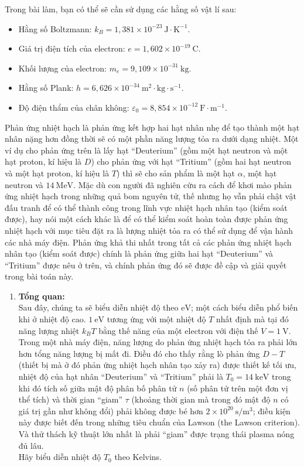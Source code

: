 \begin{vd}
Trong bài làm, bạn có thể sẽ cần sử dụng các hằng số vật lí sau:
\begin{itemize}
    \item Hằng số Boltzmann: $k_{B}=1,381\times 10^{-23}~ \mathrm{J\cdot K^{-1}}$.
    \item Giá trị điện tích của electron: $e=1,602\times 10^{-19} ~\mathrm{C}$.
    \item Khối lượng của electron: $m_{e}=9,109\times 10^{-31}~\mathrm{kg}$.
    \item Hằng số Plank: $h=6,626\times 10^{-34} ~\mathrm{m^2\cdot kg \cdot s^{-1}}$.
    \item Độ điện thẩm của chân không: $\varepsilon_0=8,854\times 10^{-12}  ~\mathrm{F\cdot m^{-1}}$.
\end{itemize}
Phản ứng nhiệt hạch là phản ứng kết hợp hai hạt nhân nhẹ để tạo thành một hạt nhân nặng hơn đồng thời sẽ có một phần năng lượng tỏa ra dưới dạng nhiệt. Một ví dụ cho phản ứng trên là lấy hạt ``Deuterium'' (gồm một hạt neutron và một hạt proton, kí hiệu là $D$) cho phản ứng với hạt ``Tritium'' (gồm hai hạt neutron và một hạt proton, kí hiệu là $T$) thì sẽ cho sản phẩm là một hạt $\alpha$, một hạt neutron và $14~\mathrm{MeV}$. Mặc dù con người đã nghiên cứu ra cách để khơi mào phản ứng nhiệt hạch trong những quả bom nguyên tử, thế nhưng họ vẫn phải chật vật đấu tranh để có thể thành công trong lĩnh vực nhiệt hạch nhân tạo (kiểm soát được), hay nói một cách khác là để có thể kiểm soát hoàn toàn được phản ứng nhiệt hạch với mục tiêu đặt ra là lượng nhiệt tỏa ra có thể sử dụng để vận hành các nhà máy điện. Phản ứng khả thi nhất trong tất cả các phản ứng nhiệt hạch nhân tạo (kiểm soát được) chính là phản ứng giữa hai hạt ``Deuterium'' và ``Tritium'' được nêu ở trên, và chính phản ứng đó sẽ được đề cập và giải quyết trong bài toán này.
\begin{enumerate}[{Phần }A.]
    \item \textbf{Tổng quan:}\\
Sau đây, chúng ta sẽ biểu diễn nhiệt độ theo $\mathrm{eV}$; một cách biểu diễn phổ biến khi ở nhiệt độ cao. $1~\mathrm{eV}$ tương ứng với một nhiệt độ $T$ nhất định mà tại đó năng lượng nhiệt $k_{B}T$ bằng thế năng của một electron với điện thế $V=1~\mathrm{V}$.\\
Trong một nhà máy điện, năng lượng do phản ứng nhiệt hạch tỏa ra phải lớn hơn tổng năng lượng bị mất đi. Điều đó cho thấy rằng lò phản ứng $D-T$ (thiết bị mà ở đó phản ứng nhiệt hạch nhân tạo xảy ra) được thiết kế tối ưu, nhiệt độ của hạt nhân ``Deuterium'' và ``Tritium'' phải là $T_0=14~\mathrm{keV}$ trong khi đó tích số giữa mật độ phân bố phân tử $n$ (số phân tử trên một đơn vị thể tích) và thời gian ``giam'' $\tau$ (khoảng thời gian mà trong đó mật độ $n$ có giá trị gần như không đổi) phải không được bé hơn $2\times 10^{20} ~\mathrm{s/m^3}$; điều kiện này được biết đến trong những tiêu chuẩn của Lawson (the Lawson criterion). Và thử thách kỹ thuật lớn nhất là phải ``giam'' được trạng thái plasma nóng đủ lâu.\\
Hãy biểu diễn nhiệt độ $T_0$ theo Kelvins.


\end{enumerate}
\end{vd}
